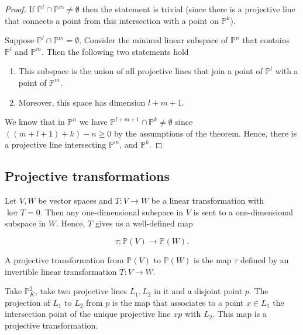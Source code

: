 \documentclass[12pt, a4paper]{article}
\newcommand{\PP}{\mathbb P}
\begin{document}
\begin{proof}
    If \(\mathbb{P}^l \cap \mathbb{P}^m \neq \emptyset\) then the statement is trivial (since there is a projective line that connects a point from this intersection with a point on \(\mathbb{P}^k\)).
    
    Suppose \(\mathbb{P}^l \cap \mathbb{P}^m = \emptyset\). Consider the minimal linear subspace of \(\mathbb{P}^n\) that contains \(\mathbb{P}^l\) and \(\mathbb{P}^m\). Then the following two statements hold
    
    \begin{enumerate}
        \item This subspace is the union of all projective lines that join a point of \(\mathbb{P}^l\) with a point of \(\mathbb{P}^m\).
        
        \item Moreover, this space has dimension \(l + m + 1\).
    \end{enumerate}
    
    We know that in \(\mathbb{P}^n\) we have \(\mathbb{P}^{l+m+1} \cap \mathbb{P}^k \neq \emptyset\) since \(((m + l + 1) + k) - n \geq 0\) by the assumptions of the theorem. Hence, there is a projective line intersecting \(\mathbb{P}^m\), and \(\mathbb{P}^k\).
\end{proof}

\subsection{Projective transformations}

Let \( V, W \) be vector spaces and \( T: V \rightarrow W \) be a linear transformation with \( \ker T = 0 \). Then any one-dimensional subspace in \( V \) is sent to a one-dimensional subspace in \( W \). Hence, \( T \) gives us a well-defined map

\[ \tau : \PP(V) \rightarrow \PP(W). \]

\begin{definition}
    A projective transformation from \( \PP(V) \) to \( \PP(W) \) is the map \( \tau \) defined by an invertible linear transformation \( T: V \rightarrow W \).
\end{definition}

\begin{example}
    Take \( \mathbb{P}^2_K \), take two projective lines \( L_1, L_2 \) in it and a disjoint point \( p \). The projection of \( L_1 \) to \( L_2 \) from \( p \) is the map that associates to a point \( x \in L_1 \) the intersection point of the unique projective line \( xp \) with \( L_2 \). This map is a projective transformation.
\end{example}
\end{document}
